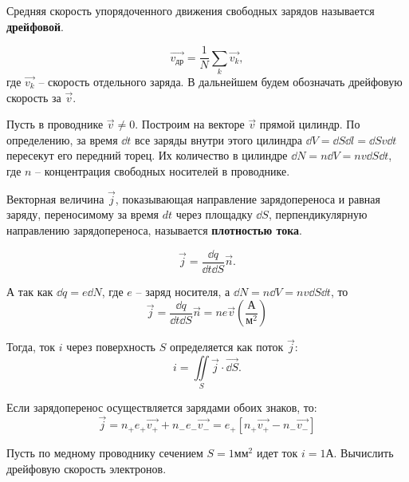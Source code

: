     \begin{definition}
        Средняя скорость упорядоченного движения свободных зарядов называется 
        \textbf{дрейфовой}.
    \end{definition}
    \begin{equation}
        \vec{v_{\textit{др}}} = \frac{1}{N}\sum\limits_k \vec{v_k},
    \end{equation}
    где \( \vec{v_k} \) -- скорость отдельного заряда. В дальнейшем будем
    обозначать дрейфовую скорость за \( \vec{v} \).
    
    Пусть в проводнике \( \vec{v} \ne 0 \). Построим на векторе \( \vec{v} \)
    прямой цилиндр. По определению, за время \( \dd t \) все заряды внутри этого
    цилиндра \( \dd V = \dd S\dd l = \dd S v \dd t \) пересекут его передний
    торец. Их количество в цилиндре \( \dd N = n\dd V = nv\dd S\dd t \),
    где \( n \) -- концентрация свободных носителей в проводнике.
    
    \begin{definition}
        Векторная величина \( \vec{j} \), показывающая направление
        зарядопереноса и равная заряду, переносимому за время \( dt \) через
        площадку \( \dd S \), перпендикулярную направлению зарядопереноса,
        называется \textbf{плотностью тока}.
    \end{definition}
    
    \[
        \vec{j} = \frac{\dd q}{\dd t\dd S}\vec{n}.
    \]

    А так как \( \dd q = e\dd N \), где \( e \) -- заряд носителя, а
    \( \dd N = n \dd V = nv \dd S \dd t \), то
    \begin{equation}
        \vec{j} = \frac{\dd q}{\dd t\dd S}\vec{n} =
        ne\vec{v} \left( \frac{\text{А}}{\text{м}^2} \right)
        \label{eq6:1}
    \end{equation}
    
    Тогда, ток \( i \) через поверхность \( S \) определяется как поток
    \( \vec{j} \):
    \[
        i = \iint\limits_S \vec{j}\cdot\vec{\dd S}.
    \]
    
    Если зарядоперенос осуществляется зарядами обоих знаков, то:
    \[
        \vec{j} = n_{+}e_{+}\vec{v_{+}} + n_{-}e_{-}\vec{v_{-}} =
        e_{+}[n_{+}\vec{v_{+}} - n_{-}\vec{v_{-}}]
    \]
    
    \begin{example}
        Пусть по медному проводнику сечением \( S = 1 \text{мм}^2 \) идет ток
        \( i = 1 \text{А} \). Вычислить дрейфовую скорость электронов.
    \end{example}
    
